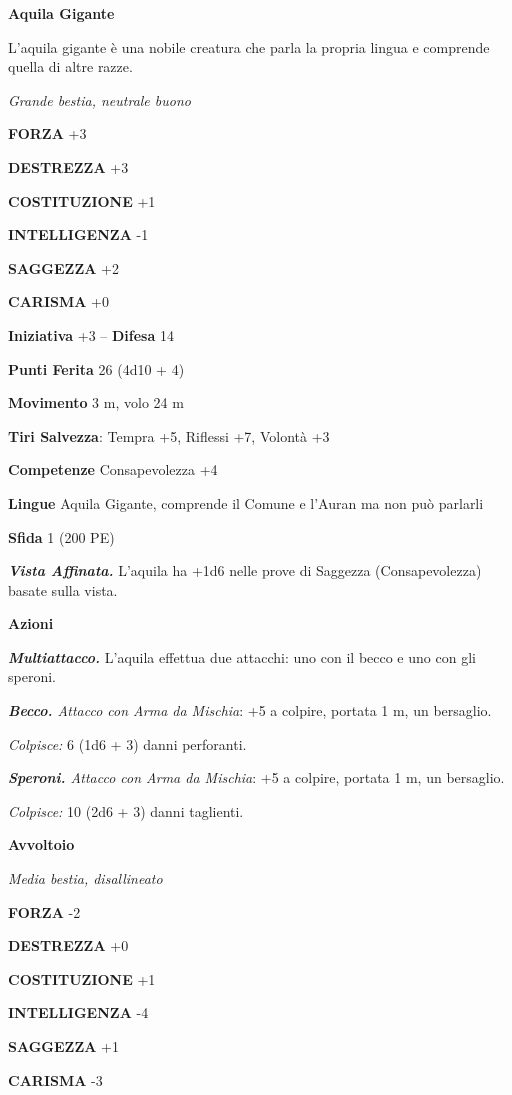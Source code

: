 \begin{multicols}{2}
\medskip\textbf{Aquila Gigante}

L'aquila gigante è una nobile creatura che parla la propria lingua e comprende quella di altre razze.

\emph{Grande bestia, neutrale buono}

\textbf{FORZA} +3

\textbf{DESTREZZA} +3

\textbf{COSTITUZIONE} +1

\textbf{INTELLIGENZA} -1

\textbf{SAGGEZZA} +2

\textbf{CARISMA} +0

\textbf{Iniziativa} +3 -- \textbf{Difesa} 14

\textbf{Punti Ferita} 26 (4d10 + 4)

\textbf{Movimento} 3 m, volo 24 m

\textbf{Tiri Salvezza}: Tempra +5, Riflessi +7, Volontà +3

\textbf{Competenze} Consapevolezza +4

\textbf{Lingue} Aquila Gigante, comprende il Comune e l'Auran ma non può parlarli

\textbf{Sfida} 1 (200 PE)

\emph{\textbf{Vista Affinata.}} L'aquila ha +1d6 nelle prove di Saggezza (Consapevolezza) basate sulla vista.

\textbf{Azioni}

\emph{\textbf{Multiattacco.}} L'aquila effettua due attacchi: uno con il becco e uno con gli speroni.

\emph{\textbf{Becco.} Attacco con Arma da Mischia}: +5 a colpire, portata 1 m, un bersaglio.

\emph{Colpisce:} 6 (1d6 + 3) danni perforanti.

\emph{\textbf{Speroni.} Attacco con Arma da Mischia}: +5 a colpire, portata 1 m, un bersaglio.

\emph{Colpisce:} 10 (2d6 + 3) danni taglienti.

\medskip\textbf{Avvoltoio}

\emph{Media bestia, disallineato}

\textbf{FORZA} -2

\textbf{DESTREZZA} +0

\textbf{COSTITUZIONE} +1

\textbf{INTELLIGENZA} -4

\textbf{SAGGEZZA} +1

\textbf{CARISMA} -3


\end{multicols}
